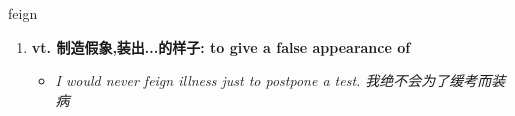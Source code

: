 
\begin{frame}
{\huge feign}
\begin{center}
\begin{enumerate}\Large
  \item \textbf{vt. 制造假象,装出...的样子: to give a false appearance of}
  \begin{itemize}
    \item \em{\Large{I would never feign illness just to postpone a test. 我绝不会为了缓考而装病}}
  \end{itemize}
\end{enumerate}
\end{center}
\end{frame}
